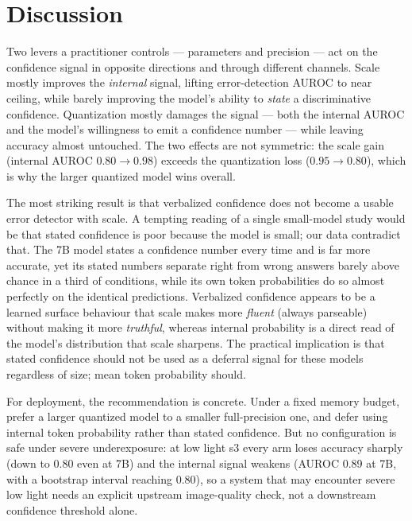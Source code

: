 \documentclass[11pt]{article}
\begin{document}
\section{Discussion}
Two levers a practitioner controls --- parameters and precision --- act on the
confidence signal in opposite directions and through different channels. Scale
mostly improves the \emph{internal} signal, lifting error-detection AUROC to near
ceiling, while barely improving the model's ability to \emph{state} a
discriminative confidence. Quantization mostly damages the signal --- both the
internal AUROC and the model's willingness to emit a confidence number --- while
leaving accuracy almost untouched. The two effects are not symmetric: the scale
gain (internal AUROC $0.80\!\to\!0.98$) exceeds the quantization loss
($0.95\!\to\!0.80$), which is why the larger quantized model wins overall.

The most striking result is that verbalized confidence does not become a usable
error detector with scale. A tempting reading of a single small-model study would
be that stated confidence is poor because the model is small; our data contradict
that. The 7B model states a confidence number every time and is far more accurate,
yet its stated numbers separate right from wrong answers barely above chance in a
third of conditions, while its own token probabilities do so almost perfectly on
the identical predictions. Verbalized confidence appears to be a learned surface
behaviour that scale makes more \emph{fluent} (always parseable) without making it
more \emph{truthful}, whereas internal probability is a direct read of the model's
distribution that scale sharpens. The practical implication is that stated
confidence should not be used as a deferral signal for these models regardless of
size; mean token probability should.

For deployment, the recommendation is concrete. Under a fixed memory budget,
prefer a larger quantized model to a smaller full-precision one, and defer using
internal token probability rather than stated confidence. But no configuration is
safe under severe underexposure: at low light s3 every arm loses accuracy sharply
(down to 0.80 even at 7B) and the internal signal weakens (AUROC 0.89 at 7B, with
a bootstrap interval reaching 0.80), so a system that may encounter severe low
light needs an explicit upstream image-quality check, not a downstream confidence
threshold alone.
\end{document}
